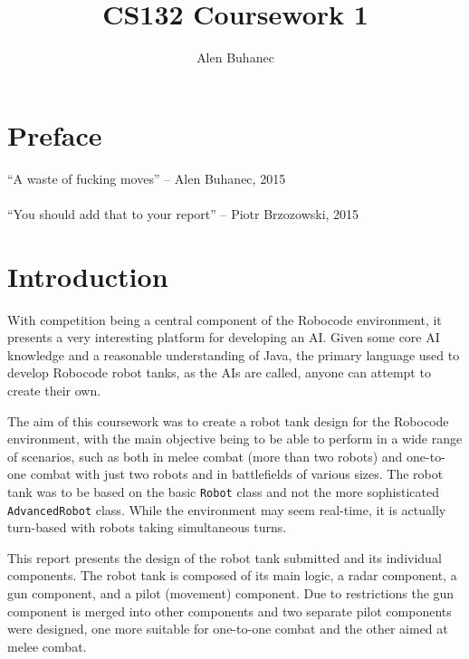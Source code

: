 \documentclass[11pt]{report}
\title{CS132 Coursework 1}
\author{Alen Buhanec}
\date{}
\begin{document}
\maketitle
\tableofcontents


\chapter{Preface}
``A waste of fucking moves'' \newline\newline\indent\indent\indent\indent\indent -- Alen Buhanec, 2015\\ \\

\noindent ``You should add that to your report''  \newline\newline\indent\indent\indent\indent\indent -- Piotr Brzozowski, 2015

\chapter{Introduction} %
With competition being a central component of the Robocode environment, it presents a very interesting platform for developing an AI. Given some core AI knowledge and a reasonable understanding of Java, the primary language used to develop Robocode robot tanks, as the AIs are called, anyone can attempt to create their own.

The aim of this coursework was to create a robot tank design for the Robocode environment, with the main objective being to be able to perform in a wide range of scenarios, such as both in melee combat (more than two robots) and one-to-one combat with just two robots and in battlefields of various sizes. The robot tank was to be based on the basic \texttt{Robot} class and not the more sophisticated \texttt{AdvancedRobot} class. While the environment may seem real-time, it is actually turn-based with robots taking simultaneous turns. %

This report presents the design of the robot tank submitted and its individual components. The robot tank is composed of its main logic, a radar component, a gun component, and a pilot (movement) component. Due to restrictions the gun component is merged into other components and two separate pilot components were designed, one more suitable for one-to-one combat and the other aimed at melee combat.
\end{document}
